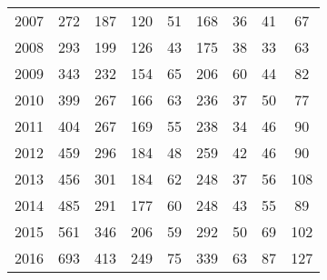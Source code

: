 \begin{table}[htbp]
\begin{tabular}{l*{8}{c}}
2007      &      272&      187&      120&       51&      168&       36&       41&       67\\
2008      &      293&      199&      126&       43&      175&       38&       33&       63\\
2009      &      343&      232&      154&       65&      206&       60&       44&       82\\
2010      &      399&      267&      166&       63&      236&       37&       50&       77\\
2011      &      404&      267&      169&       55&      238&       34&       46&       90\\
2012      &      459&      296&      184&       48&      259&       42&       46&       90\\
2013      &      456&      301&      184&       62&      248&       37&       56&      108\\
2014      &      485&      291&      177&       60&      248&       43&       55&       89\\
2015      &      561&      346&      206&       59&      292&       50&       69&      102\\
2016      &      693&      413&      249&       75&      339&       63&       87&      127\\
\hline\hline
\end{tabular}
\end{table}
